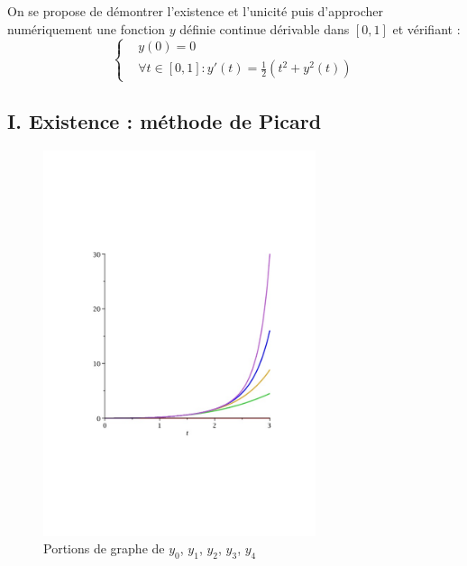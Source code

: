 On se propose de démontrer l'existence et l'unicité puis d'approcher numériquement une fonction $y$ définie continue dérivable dans $[0,1]$ et vérifiant :
\begin{displaymath}
\left\lbrace \begin{aligned}
 & y(0) = 0 \\
 & \forall t\in [0,1] : y'(t) = \frac{1}{2}\left( t^2 + y^2(t)\right) 
\end{aligned}
\right. 
\end{displaymath}
\subsection*{I. Existence : méthode de Picard}
\begin{figure}[ht]
 \centering
 \includegraphics[width=8cm]{Eapprox1_1.pdf}
 \caption{Portions de graphe de $y_0$, $y_1$, $y_2$, $y_3$, $y_4$}
 \label{fig:Eapprox1_1}
\end{figure}

